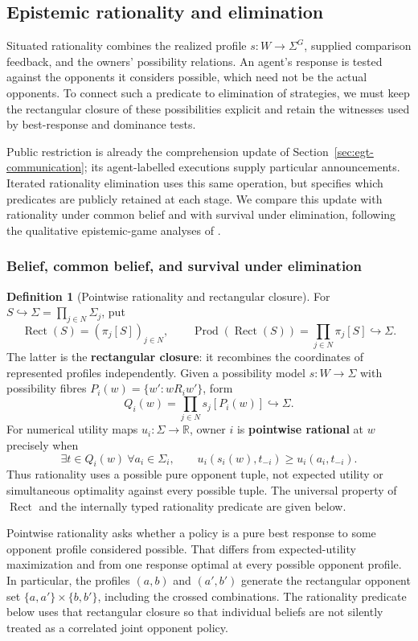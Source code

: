 \documentclass[11pt,a4paper]{article}
\numberwithin{equation}{section}
\theoremstyle{definition}
\newtheorem{definition}[theorem]{Definition}
\theoremstyle{remark}
\theoremstyle{plain}
\begin{document}
\subsection{Epistemic rationality and elimination}
\label{sec:egt-epistemic}

Situated rationality combines the realized profile
$s:W\to\Sigma^G$, supplied comparison feedback, and the owners'
possibility relations. An agent's response is tested against the
opponents it considers possible, which need not be the actual opponents.
To connect such a predicate to elimination of strategies, we must keep
the rectangular closure of these possibilities explicit and retain the
witnesses used by best-response and dominance tests.

Public restriction is already the comprehension update of
Section~\ref{sec:egt-communication}; its agent-labelled executions
supply particular announcements. Iterated rationality elimination
uses this same operation, but specifies which predicates are publicly
retained at each stage. We compare this update with rationality under
common belief and with survival under elimination, following the
qualitative epistemic-game analyses of
\citet{VanBenthemGheerbrant2010,VanBenthemPacuitRoy2011}.

\subsubsection{Belief, common belief, and survival under elimination}

\begin{definition}[Pointwise rationality and rectangular closure]
\label{def:egt-rationality-vocabulary}
For $S\hookrightarrow\Sigma=\prod_{j\in N}\Sigma_j$, put
\[
 \operatorname{Rect}(S)=(\pi_j[S])_{j\in N},\qquad
 \operatorname{Prod}(\operatorname{Rect}(S))=
 \prod_{j\in N}\pi_j[S]\hookrightarrow\Sigma.
\]
The latter is the \textbf{rectangular closure}: it recombines the
coordinates of represented profiles independently. Given a
possibility model $s:W\to\Sigma$ with possibility fibres
$P_i(w)=\{w':wR_iw'\}$, form
\[
 Q_i(w)=\prod_{j\in N}s_j[P_i(w)]\hookrightarrow\Sigma.
\]
For numerical utility maps $u_i:\Sigma\to\mathbb R$, owner $i$ is
\textbf{pointwise rational} at $w$ precisely when
\[
 \exists t\in Q_i(w)\ \forall a_i\in\Sigma_i,\qquad
 u_i(s_i(w),t_{-i})\geq u_i(a_i,t_{-i}).
\]
Thus rationality uses a possible pure opponent tuple, not expected
utility or simultaneous optimality against every possible tuple.
The universal property of $\operatorname{Rect}$ and the internally
typed rationality predicate are given below.
\end{definition}
Pointwise rationality asks whether a policy is a pure best response
to some opponent profile considered possible. That differs from
expected-utility maximization and from one response optimal at every
possible opponent profile. In particular, the profiles $(a,b)$ and
$(a',b')$ generate the rectangular opponent set
$\{a,a'\}\times\{b,b'\}$, including the crossed combinations.
The rationality predicate below uses that rectangular closure so that
individual beliefs are not silently treated as a correlated joint
opponent policy.
\end{document}
